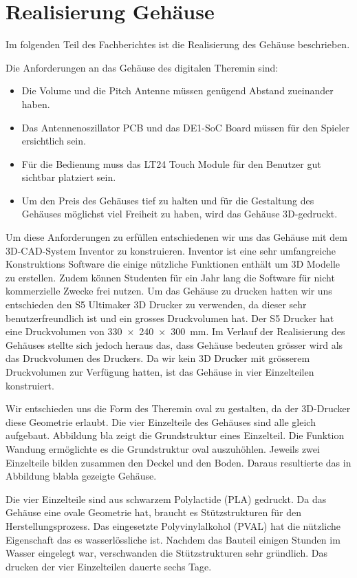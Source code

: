 \clearpage
\section{Realisierung Gehäuse}\label{sec:Realisierung Gehäuse}
Im folgenden Teil des Fachberichtes ist die Realisierung des Gehäuse beschrieben. 

Die Anforderungen an das Gehäuse des digitalen Theremin sind:
\begin{itemize}
	\item Die Volume und die Pitch Antenne müssen genügend Abstand zueinander haben.
	\item Das Antennenoszillator PCB und das DE1-SoC Board müssen für den Spieler ersichtlich sein.
	\item Für die Bedienung muss das LT24 Touch Module für den Benutzer gut sichtbar platziert sein.
	\item Um den Preis des Gehäuses tief zu halten und für die Gestaltung des Gehäuses möglichst viel Freiheit zu haben, wird das Gehäuse 3D-gedruckt.  
\end{itemize}

Um diese Anforderungen zu erfüllen entschiedenen wir uns das Gehäuse mit dem 3D-CAD-System Inventor zu konstruieren. Inventor ist eine sehr umfangreiche Konstruktions Software die einige nützliche Funktionen enthält um 3D Modelle zu erstellen. Zudem können Studenten für ein Jahr lang die Software für nicht kommerzielle Zwecke frei nutzen.
Um das Gehäuse zu drucken hatten wir uns entschieden den S5 Ultimaker 3D Drucker zu verwenden, da dieser sehr benutzerfreundlich ist und ein grosses Druckvolumen hat. 
Der S5 Drucker hat eine Druckvolumen von \SI{330x240x300}{mm}. 
Im Verlauf der Realisierung des Gehäuses stellte sich jedoch heraus das, dass Gehäuse bedeuten grösser wird als das Druckvolumen des Druckers. Da wir kein 3D Drucker mit grösserem Druckvolumen zur Verfügung hatten, ist das Gehäuse in vier Einzelteilen konstruiert. 

Wir entschieden uns die Form des Theremin oval zu gestalten, da der 3D-Drucker diese Geometrie erlaubt. Die vier Einzelteile des Gehäuses sind alle gleich aufgebaut. Abbildung bla zeigt die Grundstruktur eines Einzelteil. Die Funktion Wandung ermöglichte es die Grundstruktur oval auszuhöhlen. Jeweils zwei Einzelteile bilden zusammen den Deckel und den Boden. Daraus resultierte das in Abbildung blabla gezeigte Gehäuse. 

Die vier Einzelteile sind aus schwarzem Polylactide (PLA)  gedruckt. Da das Gehäuse eine ovale Geometrie hat, braucht es Stützstrukturen für den Herstellungsprozess. Das eingesetzte Polyvinylalkohol (PVAL) hat die nützliche Eigenschaft das es  wasserlössliche ist. Nachdem das Bauteil einigen Stunden im Wasser eingelegt war, verschwanden die Stützstrukturen sehr gründlich. 
Das drucken der vier Einzelteilen dauerte sechs Tage.    



